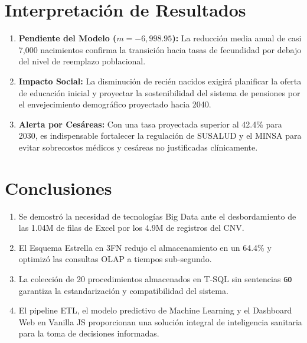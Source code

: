 \documentclass[12pt,a4paper]{article}
\begin{document}
\section{Interpretación de Resultados}

\begin{enumerate}
    \item \textbf{Pendiente del Modelo ($m = -6,998.95$):} La reducción media anual de casi 7,000 nacimientos confirma la transición hacia tasas de fecundidad por debajo del nivel de reemplazo poblacional.
    \item \textbf{Impacto Social:} La disminución de recién nacidos exigirá planificar la oferta de educación inicial y proyectar la sostenibilidad del sistema de pensiones por el envejecimiento demográfico proyectado hacia 2040.
    \item \textbf{Alerta por Cesáreas:} Con una tasa proyectada superior al 42.4\% para 2030, es indispensable fortalecer la regulación de SUSALUD y el MINSA para evitar sobrecostos médicos y cesáreas no justificadas clínicamente.
\end{enumerate}

\section{Conclusiones}

\begin{enumerate}
    \item Se demostró la necesidad de tecnologías Big Data ante el desbordamiento de las 1.04M de filas de Excel por los 4.9M de registros del CNV.
    \item El Esquema Estrella en 3FN redujo el almacenamiento en un 64.4\% y optimizó las consultas OLAP a tiempos sub-segundo.
    \item La colección de 20 procedimientos almacenados en T-SQL sin sentencias \texttt{GO} garantiza la estandarización y compatibilidad del sistema.
    \item El pipeline ETL, el modelo predictivo de Machine Learning y el Dashboard Web en Vanilla JS proporcionan una solución integral de inteligencia sanitaria para la toma de decisiones informadas.
\end{enumerate}
\end{document}
